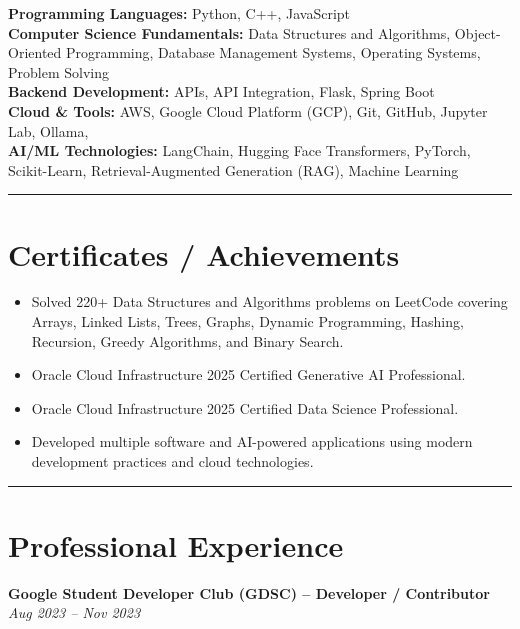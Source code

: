 \documentclass[a4paper,10pt]{article}
\newcommand{\sectionline}
{\vspace{-0.1em}\noindent\rule{\linewidth}{0.6pt}\vspace{-0.7em}}
\begin{document}
\textbf{Programming Languages:}
Python, C++, JavaScript
\\
\textbf{Computer Science Fundamentals:}
Data Structures and Algorithms,
Object-Oriented Programming,
Database Management Systems,
Operating Systems,
Problem Solving
\\
\textbf{Backend Development:}
APIs,
API Integration,
Flask,
Spring Boot
\\
\textbf{Cloud \& Tools:}
AWS,
Google Cloud Platform (GCP),
Git,
GitHub,
Jupyter Lab,
Ollama,
\\
\textbf{AI/ML Technologies:}
LangChain,
Hugging Face Transformers,
PyTorch,
Scikit-Learn,
Retrieval-Augmented Generation (RAG),
Machine Learning

\sectionline
\section*{Certificates / Achievements}

\begin{itemize}[leftmargin=1.5em,itemsep=0.05em]

\item Solved 220+ Data Structures and Algorithms problems on LeetCode covering Arrays, Linked Lists, Trees, Graphs, Dynamic Programming, Hashing, Recursion, Greedy Algorithms, and Binary Search.

\item Oracle Cloud Infrastructure 2025 Certified Generative AI Professional.
\item Oracle Cloud Infrastructure 2025 Certified Data Science Professional.
\item Developed multiple software and AI-powered applications using modern development practices and cloud technologies.

\end{itemize}


\sectionline
\section*{Professional Experience}

\textbf{Google Student Developer Club (GDSC) -- Developer / Contributor}
\hfill
\textit{Aug 2023 -- Nov 2023}
\end{document}

